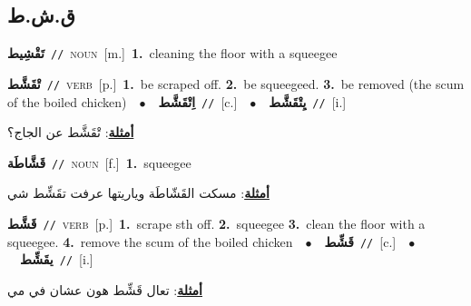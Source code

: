 \documentclass[10pt,a4paper,twoside]{article} %
\begin{document}
\begin{multicols}{2}
\vspace{-3mm}
\subsection*{\color{blue}\foreignlanguage{arabic}{ق.ش.ط}\color{blue}{}} 

{\setlength\topsep{0pt}\textbf{\foreignlanguage{arabic}{تَقْشِيط}}\ {\color{gray}\texttt{//}\color{black}}\ \textsc{noun}\ [m.]\ \textbf{1.}~cleaning the floor with a squeegee\ } \vspace{2mm}

{\setlength\topsep{0pt}\textbf{\foreignlanguage{arabic}{تْقَشَّط}}\ {\color{gray}\texttt{//}\color{black}}\ \textsc{verb}\ [p.]\ \textbf{1.}~be scraped off.  \textbf{2.}~be squeegeed.  \textbf{3.}~be removed (the scum of the boiled chicken)\ \ $\bullet$\ \ \setlength\topsep{0pt}\textbf{\foreignlanguage{arabic}{اِتْقَشَّط}}\ {\color{gray}\texttt{//}\color{black}}\ [c.]\ \ $\bullet$\ \ \setlength\topsep{0pt}\textbf{\foreignlanguage{arabic}{يِتْقَشَّط}}\ {\color{gray}\texttt{//}\color{black}}\ [i.]\  \begin{flushright}\color{gray}\foreignlanguage{arabic}{\textbf{\underline{\foreignlanguage{arabic}{أمثلة}}}: تْقَشَّط عن الجاج؟}\end{flushright}\color{black}} \vspace{2mm}

{\setlength\topsep{0pt}\textbf{\foreignlanguage{arabic}{قَشَّاطَة}}\ {\color{gray}\texttt{//}\color{black}}\ \textsc{noun}\ [f.]\ \textbf{1.}~squeegee\  \begin{flushright}\color{gray}\foreignlanguage{arabic}{\textbf{\underline{\foreignlanguage{arabic}{أمثلة}}}: مسكت القَشّاطَة وياريتها عرفت تقَشِّط شي}\end{flushright}\color{black}} \vspace{2mm}

{\setlength\topsep{0pt}\textbf{\foreignlanguage{arabic}{قَشَّط}}\ {\color{gray}\texttt{//}\color{black}}\ \textsc{verb}\ [p.]\ \textbf{1.}~scrape sth off.  \textbf{2.}~squeegee  \textbf{3.}~clean the floor with a squeegee.  \textbf{4.}~remove the scum of the boiled chicken\ \ $\bullet$\ \ \setlength\topsep{0pt}\textbf{\foreignlanguage{arabic}{قَشِّط}}\ {\color{gray}\texttt{//}\color{black}}\ [c.]\ \ $\bullet$\ \ \setlength\topsep{0pt}\textbf{\foreignlanguage{arabic}{يقَشِّط}}\ {\color{gray}\texttt{//}\color{black}}\ [i.]\  \begin{flushright}\color{gray}\foreignlanguage{arabic}{\textbf{\underline{\foreignlanguage{arabic}{أمثلة}}}: تعال قَشِّط هون عشان في مي}\end{flushright}\color{black}} \vspace{2mm}


\end{multicols}
\end{document}
